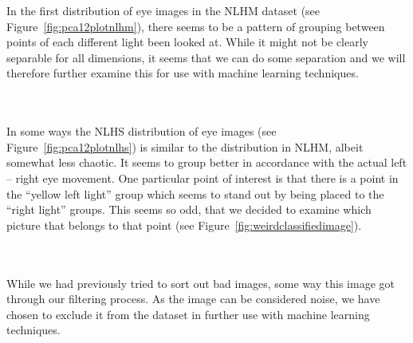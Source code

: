 In the first distribution of eye images in the NLHM dataset (see Figure~\ref{fig:pca12plotnlhm}), there seems to be a pattern of grouping between
points of each different light been looked at. While it might not be clearly separable for all dimensions, it seems that we can do some separation
and we will therefore further examine this for use with machine learning techniques.\\

\begin{minipage}{\linewidth}
  \centering
  \label{fig:pca12plotnlhs}
\end{minipage}\\\\
In some ways the NLHS distribution of eye images (see Figure~\ref{fig:pca12plotnlhs}) is similar to the distribution in NLHM, albeit somewhat less chaotic.
It seems to group better in accordance with the actual left -- right eye movement. One particular point of interest is that there is a point in the ``yellow left light'' group
which seems to stand out by being placed to the ``right light'' groups.
This seems so odd, that we decided to examine which picture that belongs to that point (see Figure~\ref{fig:weirdclassifiedimage}).\\

\begin{minipage}{\linewidth}
  \centering
  \label{fig:weirdclassifiedimage}
\end{minipage}\\\\

While we had previously tried to sort out bad images, some way this image got through our filtering process. As the image can be considered noise,
we have chosen to exclude it from the dataset in further use with machine learning techniques.\\

\begin{minipage}{\linewidth}
  \centering
  \label{fig:pca13plotwlhm}
\end{minipage}\\\\

